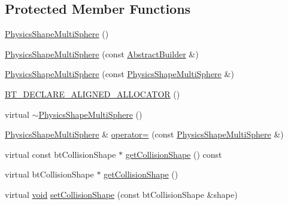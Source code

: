 \subsection*{Protected Member Functions}
\begin{DoxyCompactItemize}
\item 
\mbox{\hyperlink{classnjli_1_1_physics_shape_multi_sphere_abaccfac08f371c6f00f234abaffe5252}{Physics\+Shape\+Multi\+Sphere}} ()
\item 
\mbox{\hyperlink{classnjli_1_1_physics_shape_multi_sphere_ae260f03b0b26e25c8491fa36cf0c6273}{Physics\+Shape\+Multi\+Sphere}} (const \mbox{\hyperlink{classnjli_1_1_abstract_builder}{Abstract\+Builder}} \&)
\item 
\mbox{\hyperlink{classnjli_1_1_physics_shape_multi_sphere_ac9f725ca1a8bde780079e66a3a1d500c}{Physics\+Shape\+Multi\+Sphere}} (const \mbox{\hyperlink{classnjli_1_1_physics_shape_multi_sphere}{Physics\+Shape\+Multi\+Sphere}} \&)
\item 
\mbox{\hyperlink{classnjli_1_1_physics_shape_multi_sphere_a353c1255f1e87086f2055d8abe20e490}{B\+T\+\_\+\+D\+E\+C\+L\+A\+R\+E\+\_\+\+A\+L\+I\+G\+N\+E\+D\+\_\+\+A\+L\+L\+O\+C\+A\+T\+OR}} ()
\item 
virtual \mbox{\hyperlink{classnjli_1_1_physics_shape_multi_sphere_a5e4c8a59fdba9c2aa22f13568443470e}{$\sim$\+Physics\+Shape\+Multi\+Sphere}} ()
\item 
\mbox{\hyperlink{classnjli_1_1_physics_shape_multi_sphere}{Physics\+Shape\+Multi\+Sphere}} \& \mbox{\hyperlink{classnjli_1_1_physics_shape_multi_sphere_aea1e4639bb29535b236e1e56b90f9e44}{operator=}} (const \mbox{\hyperlink{classnjli_1_1_physics_shape_multi_sphere}{Physics\+Shape\+Multi\+Sphere}} \&)
\item 
virtual const bt\+Collision\+Shape $\ast$ \mbox{\hyperlink{classnjli_1_1_physics_shape_multi_sphere_a3e11137ac6e9e9ef6e76ee396db9297a}{get\+Collision\+Shape}} () const
\item 
virtual bt\+Collision\+Shape $\ast$ \mbox{\hyperlink{classnjli_1_1_physics_shape_multi_sphere_a591dec07102b432fbced1b4bfd093512}{get\+Collision\+Shape}} ()
\item 
virtual \mbox{\hyperlink{_thread_8h_af1e856da2e658414cb2456cb6f7ebc66}{void}} \mbox{\hyperlink{classnjli_1_1_physics_shape_multi_sphere_ae54e42a11d5b7737dad326aa1c11b2ad}{set\+Collision\+Shape}} (const bt\+Collision\+Shape \&shape)
\end{DoxyCompactItemize}
